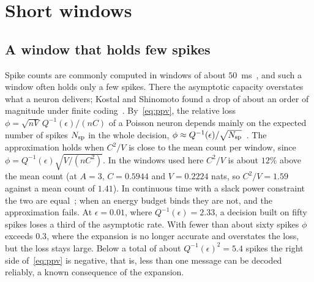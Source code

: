 \documentclass[journal]{IEEEtran}
\begin{document}
\section{Short windows}\label{sec:short}
\subsection{A window that holds few spikes}
Spike counts are commonly computed in windows of about $50$~ms~\cite{Churchland2010}, and such a window often holds only a few spikes.
There the asymptotic capacity overstates what a neuron delivers; Kostal and Shinomoto found a drop of about an order of magnitude under
finite coding~\cite{KostalShinomoto2016}. By~\eqref{eq:ppv}, the relative loss $\phi = \sqrt{nV}\,Q^{-1}(\epsilon)/(nC)$ of a Poisson
neuron depends mainly on the expected number of spikes $N_{\rm sp}$ in the whole decision, $\phi \approx Q^{-1}(\epsilon)/\sqrt{N_{\rm
sp}}$~\cite{Firdaus2026a}. The approximation holds when $C^2/V$ is close to the mean count per window, since $\phi =
Q^{-1}(\epsilon)\sqrt{V/(nC^2)}$. In the windows used here $C^2/V$ is about $12\%$ above the mean count (at $A = 3$, $C = 0.5944$ and
$V = 0.2224$ nats, so $C^2/V = 1.59$ against a mean count of $1.41$). In continuous time with a slack power constraint the two are
equal~\cite{SakaiTanKovacevic2020}; when an energy budget binds they are not, and the approximation fails. At $\epsilon = 0.01$, where
$Q^{-1}(\epsilon) = 2.33$, a decision built on fifty spikes loses a third of the asymptotic rate. With fewer than about sixty spikes
$\phi$ exceeds $0.3$, where the expansion is no longer accurate and overstates the loss, but the loss stays large. Below a total of
about $Q^{-1}(\epsilon)^2 = 5.4$ spikes the right side of~\eqref{eq:ppv} is negative, that is, less than one message can be decoded
reliably, a known consequence of the expansion.
\end{document}
